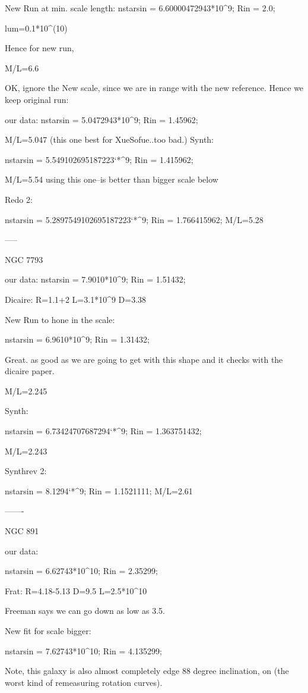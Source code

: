New Run at min. scale length:
nstarsin = 6.60000472943*10^9;
Rin = 2.0;

lum=0.1*10^(10)

Hence for new run,

M/L=6.6


OK, ignore the New scale, since we are in range with the new reference.  Hence we keep original run:

our data:
nstarsin = 5.0472943*10^9;
Rin = 1.45962;

M/L=5.047
(this one best for XueSofue..too bad.)
Synth:

nstarsin = 5.549102695187223`*^9;
Rin = 1.415962;

M/L=5.54
using this one--is better than bigger scale below

Redo 2:

nstarsin = 5.2897549102695187223`*^9;
Rin = 1.766415962;
M/L=5.28

-----

NGC 7793

our data:
nstarsin = 7.9010*10^9;
Rin = 1.51432;

Dicaire:
R=1.1+2
L=3.1*10^9
D=3.38

New Run to hone in the scale:

nstarsin = 6.9610*10^9;
Rin = 1.31432;

Great.  as good as we are going to get with this shape and it checks with the dicaire paper.

M/L=2.245

Synth:

nstarsin = 6.73424707687294`*^9;
Rin = 1.363751432;

M/L=2.243

Synthrev 2:

nstarsin = 8.1294`*^9;
Rin = 1.1521111;
M/L=2.61

-------

NGC 891

our data:

nstarsin = 6.62743*10^10;
Rin = 2.35299;

Frat: R=4.18-5.13
D=9.5
L=2.5*10^10

Freeman says we can go down as low as 3.5.

New fit for scale bigger:

nstarsin = 7.62743*10^10;
Rin = 4.135299;

Note, this galaxy is also almost completely edge 88 degree inclination,  on (the worst kind of remeasuring rotation curves).


